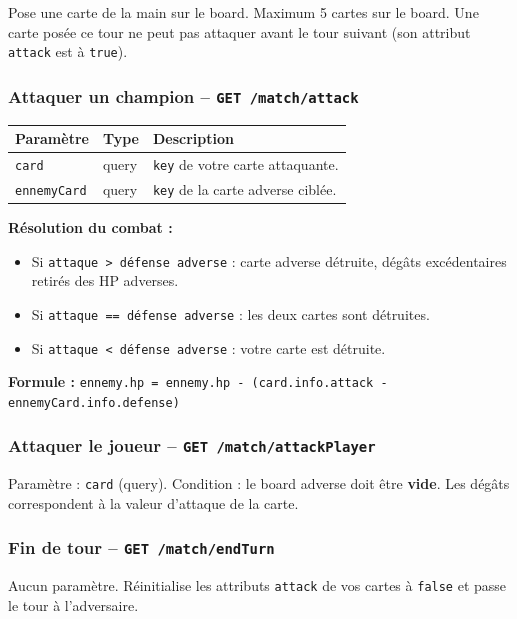 \documentclass[12pt,a4paper]{article}
\begin{document}
\vspace{0.2cm}
Pose une carte de la main sur le board. Maximum 5 cartes sur le board. Une carte posée ce tour ne peut pas attaquer avant le tour suivant (son attribut \texttt{attack} est à \texttt{true}).

\subsubsection{Attaquer un champion -- \texttt{GET /match/attack}}

\begin{tabularx}{\textwidth}{l l X}
\toprule
\textbf{Paramètre} & \textbf{Type} & \textbf{Description} \\
\midrule
\texttt{card} & query & \texttt{key} de votre carte attaquante. \\
\texttt{ennemyCard} & query & \texttt{key} de la carte adverse ciblée. \\
\bottomrule
\end{tabularx}

\vspace{0.2cm}
\textbf{Résolution du combat :}
\begin{itemize}[noitemsep]
    \item Si \texttt{attaque > défense adverse} : carte adverse détruite, dégâts excédentaires retirés des HP adverses.
    \item Si \texttt{attaque == défense adverse} : les deux cartes sont détruites.
    \item Si \texttt{attaque < défense adverse} : votre carte est détruite.
\end{itemize}

\textbf{Formule :} \texttt{ennemy.hp = ennemy.hp - (card.info.attack - ennemyCard.info.defense)}

\subsubsection{Attaquer le joueur -- \texttt{GET /match/attackPlayer}}

Paramètre : \texttt{card} (query). Condition : le board adverse doit être \textbf{vide}. Les dégâts correspondent à la valeur d'attaque de la carte.

\subsubsection{Fin de tour -- \texttt{GET /match/endTurn}}

Aucun paramètre. Réinitialise les attributs \texttt{attack} de vos cartes à \texttt{false} et passe le tour à l'adversaire.
\end{document}
